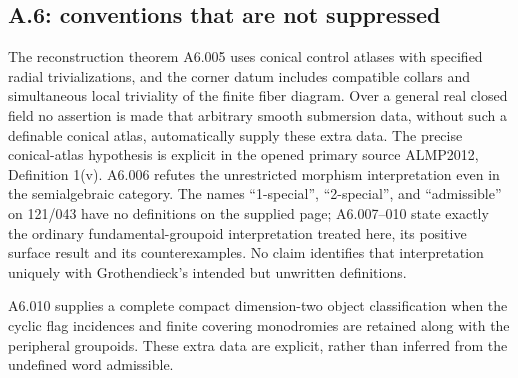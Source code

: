 \subsection*{A.6: conventions that are not suppressed}
The reconstruction theorem A6.005 uses conical control atlases with
specified radial trivializations, and the corner datum includes compatible
collars and simultaneous local triviality of the finite fiber diagram.
Over a general real closed field no assertion is made that arbitrary smooth
submersion data, without such a definable conical atlas, automatically
supply these extra data. The precise conical-atlas hypothesis is explicit
in the opened primary source ALMP2012, Definition 1(v).
A6.006 refutes the unrestricted morphism interpretation even in the
semialgebraic category. The names ``1-special'', ``2-special'', and
``admissible'' on 121/043 have no definitions on the supplied page;
A6.007--010 state exactly the ordinary fundamental-groupoid
interpretation treated here, its positive surface result and its
counterexamples. No claim identifies that interpretation uniquely with
Grothendieck's intended but unwritten definitions.

A6.010 supplies a complete compact dimension-two object classification
when the cyclic flag incidences and finite covering monodromies are
retained along with the peripheral groupoids. These extra data are
explicit, rather than inferred from the undefined word admissible.
